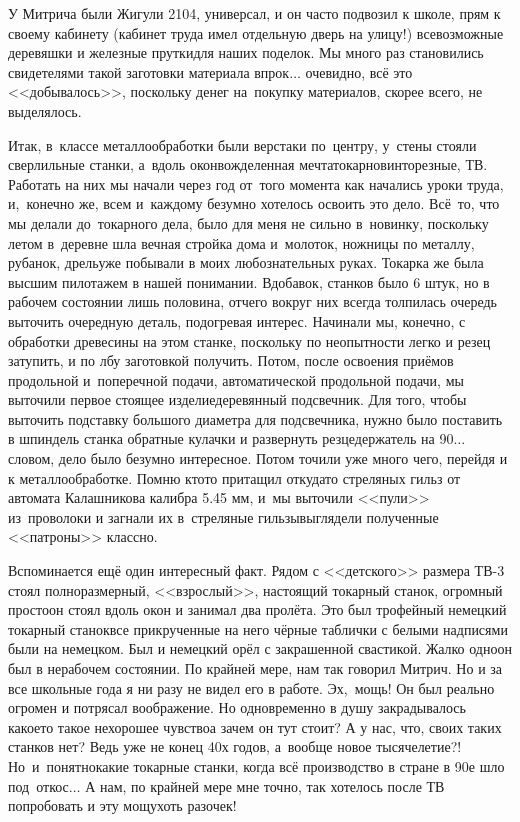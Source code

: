 У Митрича были Жигули 2104, универсал, и он часто подвозил к школе, прям к своему кабинету (кабинет труда имел отдельную дверь на улицу!) всевозможные деревяшки и железные прутки\mdash для наших поделок. Мы много раз становились свидетелями такой заготовки материала впрок$\ldots$ очевидно, всё это <<добывалось>>, поскольку денег на~покупку материалов, скорее всего, не выделялось.

Итак, в~классе металлообработки были верстаки по~центру, у~стены стояли сверлильные станки, а~вдоль окон\mdash вожделенная мечта\mdash токарно\sdash винторезные, ТВ. Работать на них мы начали через год от~того момента как начались уроки труда, и,~конечно же, всем и~каждому безумно хотелось освоить это дело. Всё~то, что мы делали до~токарного дела, было для меня не сильно в~новинку, поскольку летом в~деревне шла вечная стройка дома и~молоток, ножницы по металлу, рубанок, дрель\mdash уже побывали в моих любознательных руках. Токарка же была высшим пилотажем в нашей понимании. Вдобавок, станков было 6 штук, но в рабочем состоянии лишь половина, отчего вокруг них всегда толпилась очередь выточить очередную деталь, подогревая интерес. Начинали мы, конечно, с обработки древесины на этом станке, поскольку по неопытности легко и резец затупить, и по лбу заготовкой получить. Потом, после освоения приёмов продольной и~поперечной подачи, автоматической продольной подачи, мы выточили первое стоящее изделие\mdash деревянный подсвечник. Для того, чтобы выточить подставку большого диаметра для подсвечника, нужно было поставить в шпиндель станка обратные кулачки и развернуть резцедержатель на 90\degree$\ldots$ словом, дело было безумно интересное. Потом точили уже много чего, перейдя и к металлообработке. Помню кто\sdash то притащил откуда\sdash то стреляных гильз от автомата Калашникова калибра 5.45 мм, и~мы выточили <<пули>> из~проволоки и загнали их в~стреляные гильзы\mdash выглядели полученные <<патроны>> классно. 

Вспоминается ещё один интересный факт. Рядом с <<детского>> размера ТВ-3 стоял полноразмерный, <<взрослый>>, настоящий токарный станок, огромный просто\mdash он стоял вдоль окон и занимал два пролёта. Это был трофейный немецкий токарный станок\mdash все прикрученные на него чёрные таблички с белыми надписями были на немецком. Был и немецкий орёл с закрашенной свастикой. Жалко одно\mdash он был в нерабочем состоянии. По крайней мере, нам так говорил Митрич. Но и за все школьные года я ни разу не видел его в работе. Эх,~мощь! Он был реально огромен и потрясал воображение. Но одновременно в душу закрадывалось какое\sdash то такое нехорошее чувство\mdash а зачем он тут стоит? А у нас, что, своих таких станков нет? Ведь уже не конец 40\sdash х годов, а~вообще новое тысячелетие?! Но~и~понятно\mdash какие токарные станки, когда всё производство в стране в 90\sdash е шло под~откос$\ldots$ А нам, по крайней мере мне точно, так хотелось после ТВ попробовать и эту мощу\mdash хоть разочек! 

